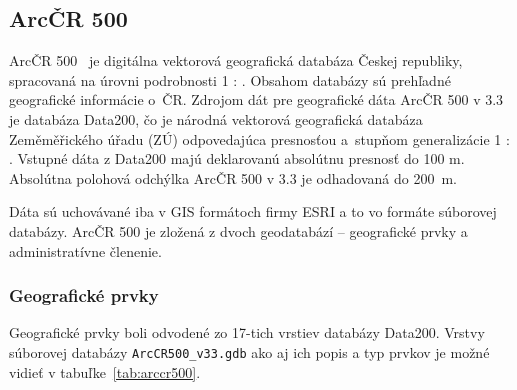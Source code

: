 \subsection{ArcČR 500}
ArcČR 500~\cite{arcgis} je digitálna vektorová geografická databáza Českej republiky, spracovaná na úrovni podrobnosti 1 : . Obsahom databázy sú prehľadné geografické informácie o~ČR. Zdrojom dát pre geografické dáta ArcČR 500 v 3.3 je databáza Data200, čo je národná vektorová geografická databáza Zeměměřického úřadu (ZÚ) odpovedajúca presnosťou a~stupňom generalizácie 1 : . Vstupné dáta z Data200 majú deklarovanú absolútnu presnosť do 100 m. Absolútna polohová odchýlka ArcČR 500 v 3.3 je odhadovaná do 200~m.

Dáta sú uchovávané iba v GIS formátoch firmy ESRI a to vo formáte súborovej databázy. ArcČR 500 je zložená z dvoch geodatabází \--- geografické prvky a administratívne členenie.

\subsubsection*{Geografické prvky}
Geografické prvky boli odvodené zo 17-tich vrstiev databázy Data200. Vrstvy súborovej databázy \texttt{ArcCR500\_v33.gdb} ako aj ich popis a typ prvkov je možné vidieť v tabuľke~\ref{tab:arccr500}.

